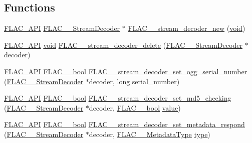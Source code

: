 \subsection*{Functions}
\begin{DoxyCompactItemize}
\item 
\mbox{\hyperlink{group__flac__export_ga56ca07df8a23310707732b1c0007d6f5}{F\+L\+A\+C\+\_\+\+A\+PI}} \mbox{\hyperlink{struct_f_l_a_c_____stream_decoder}{F\+L\+A\+C\+\_\+\+\_\+\+Stream\+Decoder}} $\ast$ \mbox{\hyperlink{group__flac__stream__decoder_ga7159eefc074dfbab4a37462f69326091}{F\+L\+A\+C\+\_\+\+\_\+stream\+\_\+decoder\+\_\+new}} (\mbox{\hyperlink{_s_d_l__opengles2__gl2ext_8h_ae5d8fa23ad07c48bb609509eae494c95}{void}})
\item 
\mbox{\hyperlink{group__flac__export_ga56ca07df8a23310707732b1c0007d6f5}{F\+L\+A\+C\+\_\+\+A\+PI}} \mbox{\hyperlink{_s_d_l__opengles2__gl2ext_8h_ae5d8fa23ad07c48bb609509eae494c95}{void}} \mbox{\hyperlink{group__flac__stream__decoder_gab958ee28b829be37e541946676ad9677}{F\+L\+A\+C\+\_\+\+\_\+stream\+\_\+decoder\+\_\+delete}} (\mbox{\hyperlink{struct_f_l_a_c_____stream_decoder}{F\+L\+A\+C\+\_\+\+\_\+\+Stream\+Decoder}} $\ast$decoder)
\item 
\mbox{\hyperlink{group__flac__export_ga56ca07df8a23310707732b1c0007d6f5}{F\+L\+A\+C\+\_\+\+A\+PI}} \mbox{\hyperlink{ordinals_8h_a95103469f1cbd78b8cf250194985b34e}{F\+L\+A\+C\+\_\+\+\_\+bool}} \mbox{\hyperlink{group__flac__stream__decoder_ga7bb4d567a4a07c911a895b9cef7551d9}{F\+L\+A\+C\+\_\+\+\_\+stream\+\_\+decoder\+\_\+set\+\_\+ogg\+\_\+serial\+\_\+number}} (\mbox{\hyperlink{struct_f_l_a_c_____stream_decoder}{F\+L\+A\+C\+\_\+\+\_\+\+Stream\+Decoder}} $\ast$decoder, long serial\+\_\+number)
\item 
\mbox{\hyperlink{group__flac__export_ga56ca07df8a23310707732b1c0007d6f5}{F\+L\+A\+C\+\_\+\+A\+PI}} \mbox{\hyperlink{ordinals_8h_a95103469f1cbd78b8cf250194985b34e}{F\+L\+A\+C\+\_\+\+\_\+bool}} \mbox{\hyperlink{group__flac__stream__decoder_ga48074d18a17ea88e8272cc8f865ae6e6}{F\+L\+A\+C\+\_\+\+\_\+stream\+\_\+decoder\+\_\+set\+\_\+md5\+\_\+checking}} (\mbox{\hyperlink{struct_f_l_a_c_____stream_decoder}{F\+L\+A\+C\+\_\+\+\_\+\+Stream\+Decoder}} $\ast$decoder, \mbox{\hyperlink{ordinals_8h_a95103469f1cbd78b8cf250194985b34e}{F\+L\+A\+C\+\_\+\+\_\+bool}} \mbox{\hyperlink{_s_d_l__opengl__glext_8h_a8ad81492d410ff2ac11f754f4042150f}{value}})
\item 
\mbox{\hyperlink{group__flac__export_ga56ca07df8a23310707732b1c0007d6f5}{F\+L\+A\+C\+\_\+\+A\+PI}} \mbox{\hyperlink{ordinals_8h_a95103469f1cbd78b8cf250194985b34e}{F\+L\+A\+C\+\_\+\+\_\+bool}} \mbox{\hyperlink{group__flac__stream__decoder_ga1644555cae7c54215c39bb4971100728}{F\+L\+A\+C\+\_\+\+\_\+stream\+\_\+decoder\+\_\+set\+\_\+metadata\+\_\+respond}} (\mbox{\hyperlink{struct_f_l_a_c_____stream_decoder}{F\+L\+A\+C\+\_\+\+\_\+\+Stream\+Decoder}} $\ast$decoder, \mbox{\hyperlink{group__flac__format_gac71714ba8ddbbd66d26bb78a427fac01}{F\+L\+A\+C\+\_\+\+\_\+\+Metadata\+Type}} \mbox{\hyperlink{_s_d_l__opengl_8h_ad5ddf6fca7b585646515660e810e0188}{type}})

\end{DoxyCompactItemize}
